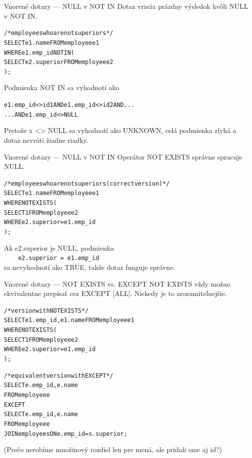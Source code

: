 \documentclass[12pt]{beamer}
\begin{document}
\begin{frame}[fragile]{Vnorené dotazy --- NULL v NOT IN}
Dotaz vracia \alert{prázdny} výsledok kvôli NULL v NOT IN.
\medskip

\begin{scriptsize}
\begin{alltt}
/* employees who are not superiors */
SELECT e1.name FROM employee e1
WHERE e1.emp_id NOT IN (
    SELECT e2.superior FROM employee e2
);
\end{alltt}
\end{scriptsize}
\smallskip
Podmienka NOT IN sa vyhodnotí ako
\begin{small}
\begin{alltt}
e1.emp_id <> id1 AND e1.emp_id <> id2 AND ...
  ... AND \alert{e1.emp_id <> NULL}
\end{alltt}
\end{small}
\smallskip
Pretože x <> NULL sa vyhodnotí ako UNKNOWN, celá podmienka
zlyhá a dotaz nevráti žiadne riadky.
\end{frame}

\begin{frame}[fragile]{Vnorené dotazy --- NULL v NOT IN}
Operátor NOT EXISTS \alert{správne spracuje NULL}.
\medskip

\begin{scriptsize}
\begin{alltt}
/* employees who are not superiors (correct version) */
SELECT e1.name FROM employee e1
WHERE NOT EXISTS (
    SELECT 1 FROM employee e2
    WHERE e2.superior = e1.emp_id
);
\end{alltt}
\end{scriptsize}
\smallskip
Ak e2.superior je NULL, podmienka\\
\verb|    e2.superior = e1.emp_id|\\
sa nevyhodnotí ako TRUE, takže dotaz funguje správne.
\end{frame}

\begin{frame}[fragile]{Vnorené dotazy --- NOT EXISTS vs. EXCEPT}
NOT EXISTS vždy možno ekvivalentne prepísať cez \alert{EXCEPT [ALL]}.
Niekedy je to zrozumiteľnejšie.
\medskip

\begin{scriptsize}
\begin{alltt}
/* version with NOT EXISTS */
SELECT e1.emp_id, e1.name FROM employee e1
WHERE NOT EXISTS (
    SELECT 1 FROM employee e2
    WHERE e2.superior = e1.emp_id
);

/* equivalent version with EXCEPT */
SELECT e.emp_id, e.name
FROM employee e
\alert{EXCEPT}
SELECT e.emp_id, e.name
FROM employee e
    JOIN employee s ON e.emp_id = s.superior;
\end{alltt}
\end{scriptsize}
\smallskip
(Prečo nerobíme množinový rozdiel len pre mená, ale pridali sme aj id?)
\end{frame}
\end{document}
